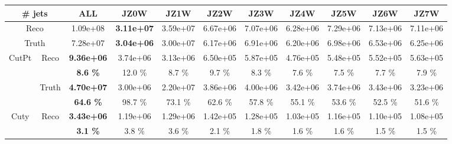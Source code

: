 \begin{appendices}
\begin{landscape} 
\begin{table}
  \scriptsize
  \centering
  \begin{tabular}{|c|c|>{\bfseries}c|c|c|c|c|c|c|c|c|}
    \hline
     \multicolumn{2}{|c|}{\# jets}  & ALL      & JZ0W     & JZ1W     & JZ2W     & JZ3W     & JZ4W     & JZ5W     & JZ6W     & JZ7W     \\
    \hline                                                              
    \hline                                                              
     \multicolumn{2}{|c|}{Reco}                               & 1.09e+08 & 3.11e+07 & 3.59e+07 & 6.67e+06 & 7.07e+06 & 6.28e+06 & 7.29e+06 & 7.13e+06 & 7.11e+06 \\
    \hline                                                                                          
     \multicolumn{2}{|c|}{Truth}                                & 7.28e+07 & 3.04e+06 & 3.00e+07 & 6.17e+06 & 6.91e+06 & 6.20e+06 & 6.98e+06 & 6.53e+06 & 6.25e+06 \\
    \hline                                                                                      
    \hline                                                                                      
    \multirow{4}{*}{CutPt}          & \multirow{2}{*}{Reco}   & 9.36e+06 & 3.74e+06 & 3.13e+06 & 6.50e+05 & 5.87e+05 & 4.76e+05 & 5.48e+05 & 5.52e+05 & 5.63e+05 \\
                                    &                           & 8.6 \%   & 12.0 \%  & 8.7 \%   & 9.7 \%   & 8.3 \%   & 7.6 \%   & 7.5 \%   & 7.7 \%   & 7.9 \%   \\
    \cline{2-11}                                                                                
                                    & \multirow{2}{*}{Truth}    & 4.70e+07 & 3.00e+06 & 2.20e+07 & 3.86e+06 & 4.00e+06 & 3.42e+06 & 3.74e+06 & 3.43e+06 & 3.23e+06 \\
                                    &                           & 64.6 \%  & 98.7 \%  & 73.1 \%  & 62.6 \%  & 57.8 \%  & 55.1 \%  & 53.6 \%  & 52.5 \%  & 51.6 \%  \\
    \hline                                                                                      
    \hline                                                                                      
    \multirow{4}{*}{Cuty}           & \multirow{2}{*}{Reco}   & 3.43e+06 & 1.19e+06 & 1.29e+06 & 1.42e+05 & 1.28e+05 & 1.03e+05 & 1.16e+05 & 1.10e+05 & 1.08e+05 \\
                                    &                           & 3.1 \%   & 3.8 \%   & 3.6 \%   & 2.1 \%   & 1.8 \%   & 1.6 \%   & 1.6 \%   & 1.5 \%   & 1.5 \%   \\

\end{tabular}
\end{table}
\end{landscape}
\end{appendices}
